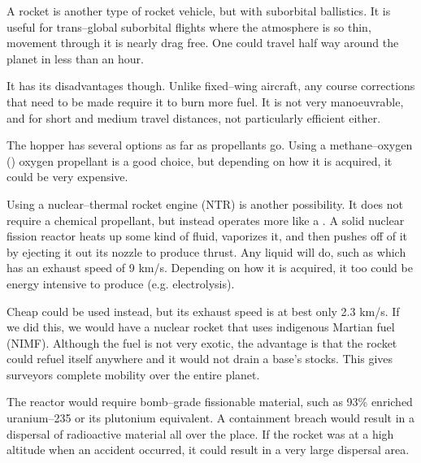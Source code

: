 A rocket  is another type of rocket vehicle, but with suborbital ballistics. It is useful for trans--global suborbital flights where the atmosphere is so thin, movement through it is nearly drag free. One could travel half way around the planet in less than an hour. 

It has its disadvantages though. Unlike fixed--wing aircraft, any course corrections that need to be made require it to burn more fuel. It is not very manoeuvrable, and for short and medium travel distances, not particularly efficient either.

The hopper has several options as far as propellants go. Using a methane--oxygen ()  oxygen propellant is a good choice, but depending on how it is acquired, it could be very expensive.

Using a nuclear--thermal rocket engine (NTR) is another possibility. It does not require a chemical propellant, but instead operates more like a . A solid nuclear fission reactor heats up some kind of fluid, vaporizes it, and then pushes off of it by ejecting it out its nozzle to produce thrust. Any liquid will do, such as  which has an exhaust speed of 9 km/s. Depending on how it is acquired, it too could be energy intensive to produce (e.g. electrolysis).

Cheap  could be used instead, but its exhaust speed is at best only 2.3 km/s. If we did this, we would have a nuclear rocket that uses indigenous Martian fuel (NIMF). Although the fuel is not very exotic, the advantage is that the rocket could refuel itself anywhere and it would not drain a base's  stocks. This gives surveyors complete mobility over the entire planet.

The reactor would require bomb--grade fissionable material, such as 93\% enriched uranium--235 or its plutonium equivalent. A containment breach would result in a dispersal of radioactive material all over the place. If the rocket was at a high altitude when an accident occurred, it could result in a very large dispersal area.

